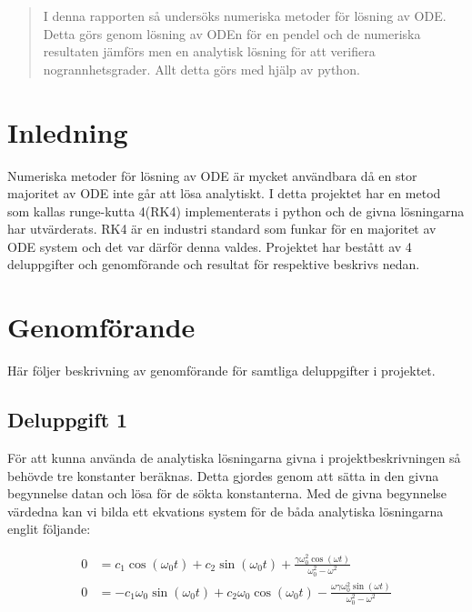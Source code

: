 \documentclass[12pt]{article}
\begin{document}
\pagebreak
\begin{abstract}
    I denna rapporten så undersöks numeriska metoder för lösning av ODE. Detta görs genom lösning av ODEn för en pendel och de numeriska resultaten jämförs men en analytisk lösning för att verifiera nogrannhetsgrader. Allt detta görs med hjälp av python. 
\end{abstract}
\pagebreak
\tableofcontents
\pagebreak
\section{Inledning}
Numeriska metoder för lösning av ODE är mycket användbara då en stor majoritet av ODE inte går att lösa analytiskt. I detta projektet har en metod som kallas runge-kutta 4(RK4) implementerats i python och de givna lösningarna har utvärderats. RK4 är en industri standard som funkar för en majoritet av ODE system och det var därför denna valdes. Projektet har bestått av 4 deluppgifter och genomförande och resultat för respektive beskrivs nedan. 

\section{Genomförande}
Här följer beskrivning av genomförande för samtliga deluppgifter i projektet.

\subsection{Deluppgift 1}
För att kunna använda de analytiska lösningarna givna i projektbeskrivningen så behövde tre konstanter beräknas. Detta gjordes genom att sätta in den givna begynnelse datan och lösa för de sökta konstanterna. Med de givna begynnelse värdedna kan vi bilda ett ekvations system för de båda analytiska lösningarna englit följande:

\begin{align}
    0 &= c_1 \cos(\omega_0 t) + c_2 \sin(\omega_0 t) + \frac{\gamma\omega_0^2 \cos(\omega t)}{\omega_0^2 - \omega^2}\\
    0 &= - c_1\omega_0 \sin(\omega_0t) + c_2\omega_0 \cos(\omega_0 t) - \frac{\omega\gamma\omega_0^2 \sin(\omega t)}{\omega_0^2 - \omega^2}
\end{align}
\end{document}
